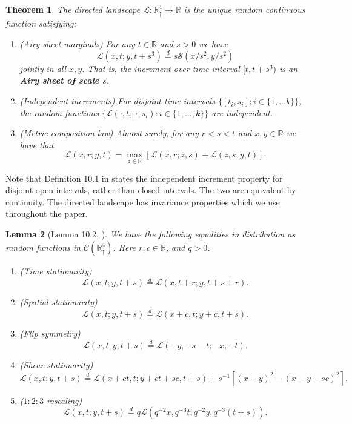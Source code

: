 \documentclass[11pt]{article}
\newcommand{\R}{\mathbb{R}}
\newcommand{\Rd}{\mathbb{R}^4_\uparrow}
\newcommand{\cC}{\mathcal{C}}
\newcommand{\cL}{\mathcal{L}}
\newcommand{\cS}{\mathcal{S}}
\newcommand{\eqd}{\stackrel{d}{=}}
\newtheorem{theorem}{Theorem}[section]
\newtheorem{lemma}[theorem]{Lemma}
\theoremstyle{definition} %
\theoremstyle{remark} %
\begin{document}
\begin{theorem}
	\label{T:L-unique}	
	The directed landscape $\cL:\Rd \to \R$ is the unique random continuous function satisfying:
	\begin{enumerate}
		\item (Airy sheet marginals) For any $t\in \R$ and $s>0$ we have 
		$$
		\mathcal{\cL}(x, t; y,t+s^3) \eqd s \cS(x/s^2, y/s^2) 
		$$
		jointly in all $x, y$. That is, the increment over time interval $[t,t+s^3)$ is an \textbf{Airy sheet of scale $s$}.
		\item (Independent increments) For disjoint time intervals $\{[t_i, s_i] : i \in \{1, \dots k\}\}$, the random functions
		$
		\{\cL(\cdot, t_i ; \cdot, s_i) : i \in \{1, \dots, k \}\}
		$
		are independent.
		\item (Metric composition law) Almost surely, for any $r<s<t$ and $x, y \in \R$ we have that
		$$
		\cL(x,r;y,t)=\max_{z \in \mathbb R} [\cL(x,r;z,s)+\cL(z,s;y,t)].
		$$
	\end{enumerate}
\end{theorem} 

Note that Definition 10.1 in \cite{DOV} states the independent increment property for disjoint open intervals, rather than closed intervals. The two are equivalent by continuity. The directed landscape has invariance properties which we use throughout the paper. 

\begin{lemma} [Lemma 10.2, \cite{DOV}]
	\label{L:invariance} We have the following equalities in distribution as random functions in $\cC(\R^4_\uparrow)$. Here $r, c \in \R$, and $q > 0$.
	\begin{enumerate}
		\item (Time stationarity)
		$$
		\displaystyle
		\cL(x, t ; y, t + s) \eqd \cL(x, t + r ; y, t + s + r).
		$$
		\item (Spatial stationarity)
		$$
		\cL(x, t ; y, t + s) \eqd \cL(x + c, t; y + c, t + s).
		$$
		\item (Flip symmetry)
		$$
		\cL(x, t ; y, t + s) \eqd \cL(-y, -s-t; -x, -t).
		$$
		\item (Shear stationarity)
		$$
		\cL(x, t ; y, t + s) \eqd \cL(x + ct, t; y + ct + sc, t + s) + s^{-1}[(x - y)^2 - (x - y - sc)^2].
		$$
		\item ($1:2:3$ rescaling)
		$$
		\cL(x, t ; y, t + s) \eqd  q \cL(q^{-2} x, q^{-3}t; q^{-2} y, q^{-3}(t + s)).
		$$
	\end{enumerate}
\end{lemma}
\end{document}
